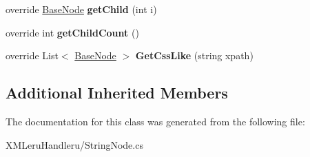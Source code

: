 \begin{DoxyCompactItemize}
\item 
\hypertarget{class_x_m_leru_handleru_1_1_string_node_aab1723e0d3ece1da14a5e3ebf07bf541}{}override \hyperlink{class_x_m_leru_handleru_1_1_base_node}{Base\+Node} {\bfseries get\+Child} (int i)\label{class_x_m_leru_handleru_1_1_string_node_aab1723e0d3ece1da14a5e3ebf07bf541}

\item 
\hypertarget{class_x_m_leru_handleru_1_1_string_node_a2207b714636aa065f607108d19994757}{}override int {\bfseries get\+Child\+Count} ()\label{class_x_m_leru_handleru_1_1_string_node_a2207b714636aa065f607108d19994757}

\item 
\hypertarget{class_x_m_leru_handleru_1_1_string_node_af1a0f24fafb8da6a57e72c951bb16dc1}{}override List$<$ \hyperlink{class_x_m_leru_handleru_1_1_base_node}{Base\+Node} $>$ {\bfseries Get\+Css\+Like} (string xpath)\label{class_x_m_leru_handleru_1_1_string_node_af1a0f24fafb8da6a57e72c951bb16dc1}

\end{DoxyCompactItemize}
\subsection*{Additional Inherited Members}


The documentation for this class was generated from the following file\+:\begin{DoxyCompactItemize}
\item 
X\+M\+Leru\+Handleru/String\+Node.\+cs\end{DoxyCompactItemize}
